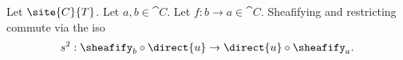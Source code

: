 \begin{corollary}
Let $\site{C}{T}$.
Let $a,b \in \cat{C}$.
Let $f: b\rightarrow a \in \cat{C}$.
Sheafifying and restricting commute via the iso
\[s^2: \sheafify_b \circ \direct{u} \rightarrow \direct{u} \circ \sheafify_a.\]
\end{corollary}





 





